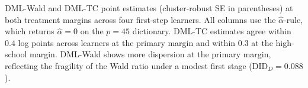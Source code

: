 \begin{table}[H]
    \centering
    \small
    
    \caption[DML estimates across four first-step learners]{DML-Wald and DML-TC point estimates (cluster-robust SE in parentheses) at both treatment margins across four first-step learners. All columns use the $\hat\alpha$-rule, which returns $\hat\alpha = 0$ on the $p=45$ dictionary. DML-TC estimates agree within $0.4$ log points across learners at the primary margin and within $0.3$ at the high-school margin. DML-Wald shows more dispersion at the primary margin, reflecting the fragility of the Wald ratio under a modest first stage ($\mathrm{DID}_D = 0.088$).}\label{tab:empirical_4learner}
\end{table}
